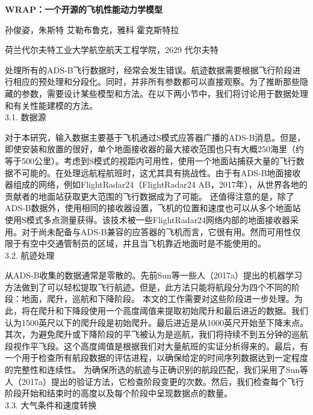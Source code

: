 \documentclass[a4paper,punct,space,heading=true,AutoFakeBold]{ctexrep}
\newcommand{\sihao}{\fontsize{14pt}{\baselineskip}\selectfont}
\newcommand{\xiaosi}{\fontsize{12pt}{\baselineskip}\selectfont}
\newcommand{\wuhao}{\fontsize{10.5pt}{\baselineskip}\selectfont}
\begin{document}
\begin{center}
	\setlength\abovedisplayskip{18pt}
	\setlength{\baselineskip}{20pt}
	\sihao\bfseries\songti WRAP：一个开源的飞机性能动力学模型
	\setlength\belowdisplayskip{18pt}
\end{center}
\vspace{0.05em}
\begin{center}
	\wuhao
	孙俊姿，朱斯特 艾勒布鲁克，雅科 霍克斯特拉
	
	荷兰代尔夫特工业大学航空航天工程学院，2629 代尔夫特
\end{center}

{
	\noindent\xiaosi\bfseries{}
}

处理所有的ADS-B飞行数据时，经常会发生错误。航迹数据需要根据飞行阶段进行相应的预处理和分段化。同时，并非所有参数都可以直接观察。为了推断那些隐藏的参数，需要设计某些模型和方法。在以下两小节中，我们将讨论用于数据处理和有关性能建模的方法。\\
3.1. 数据源

对于本研究，输入数据主要基于飞机通过S模式应答器广播的ADS-B消息。但是，即使安装和放置的很好，单个地面接收器的最大接收范围也只有大概250海里（约等于500公里）。考虑到S模式的视距内可用性，使用一个地面站捕获大量的飞行数据不可能的。在处理远航程航班时，这尤其具有挑战性。由于有ADS-B地面接收器组成的网络，例如FlightRadar24（FlightRadar24 AB，2017年），从世界各地的贡献者的地面站获取更大范围的飞行数据成为了可能。
还值得注意的是，除了ADS-B数据外，使用相同的接收器设置，飞机的位置和速度也可以从多个地面站使用S模式多点测量获得。该技术被一些FlightRadar24网络内部的地面接收器采用。对于尚未配备与ADS-B兼容的应答器的飞机而言，它很有用。然而可用性仅限于有空中交通管制员的区域，并且当飞机靠近地面时是不能使用的。\\
3.2. 航迹处理

从ADS-B收集的数据通常是零散的。先前Sun等一些人（2017a）提出的机器学习方法做到了可以轻松提取飞行航迹。但是，此方法只能将航段分为四个不同的阶段：地面，爬升，巡航和下降阶段。
本文的工作需要对这些阶段进一步处理。为此，将在爬升和下降段使用一个高度阈值来提取初始爬升和最后进近的数据。我们认为1500英尺以下的爬升段是初始爬升。最后进近是从1000英尺开始至下降末点。其次，为避免爬升或下降阶段的平飞被认为是巡航，我们将持续不到五分钟的巡航段视作平飞段。这个高度阈值是根据我们对大量航班的实证分析得来的。最后，有一个用于检查所有航段数据的评估进程，以确保给定的时间序列数据达到一定程度的完整性和连续性。
为确保所选的航迹与正确识别的航段匹配，我们采用了Sun等人（2017a）提出的验证方法，它检查阶段变更的次数。然后，我们检查每个飞行阶段开始和结束时的高度以及每个阶段中呈现数据点的数量。\\
3.3. 大气条件和速度转换
\end{document}
